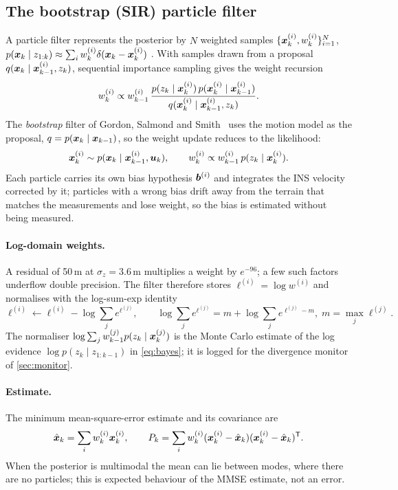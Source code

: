 \subsection{The bootstrap (SIR) particle filter}\label{sec:pf}
A particle filter represents the posterior by $N$ weighted samples
$\{\bm{x}_k^{(i)}, w_k^{(i)}\}_{i=1}^N$,
$p(\bm{x}_k \mid z_{1:k}) \approx \sum_i w_k^{(i)} \delta(\bm{x}_k - \bm{x}_k^{(i)})$
\cite{gordon1993,arulampalam2002,doucet2011}. With samples drawn from a proposal
$q(\bm{x}_k \mid \bm{x}_{k-1}^{(i)}, z_k)$, sequential importance sampling gives the weight recursion
\begin{equation}
  w_k^{(i)} \propto w_{k-1}^{(i)}\,
  \frac{p(z_k \mid \bm{x}_k^{(i)})\, p(\bm{x}_k^{(i)} \mid \bm{x}_{k-1}^{(i)})}
       {q(\bm{x}_k^{(i)} \mid \bm{x}_{k-1}^{(i)}, z_k)}.
\end{equation}
The \emph{bootstrap} filter of Gordon, Salmond and Smith~\cite{gordon1993} uses the motion
model as the proposal, $q = p(\bm{x}_k \mid \bm{x}_{k-1})$, so the weight update reduces to the
likelihood:
\begin{equation}
  \bm{x}_k^{(i)} \sim p(\bm{x}_k \mid \bm{x}_{k-1}^{(i)}, \bm{u}_k),\qquad
  w_k^{(i)} \propto w_{k-1}^{(i)}\, p(z_k \mid \bm{x}_k^{(i)}).
  \label{eq:sir}
\end{equation}
Each particle carries its own bias hypothesis $\bm{b}^{(i)}$ and integrates the INS velocity
corrected by it; particles with a wrong bias drift away from the terrain that matches the
measurements and lose weight, so the bias is estimated without being measured.

\paragraph{Log-domain weights.} A residual of 50\,m at $\sigma_z = 3.6$\,m multiplies a weight by
$e^{-96}$; a few such factors underflow double precision. The filter therefore stores
$\ell^{(i)} = \log w^{(i)}$ and normalises with the log-sum-exp identity
\begin{equation}
  \ell^{(i)} \leftarrow \ell^{(i)} - \log\sum_j e^{\ell^{(j)}}, \qquad
  \log\sum_j e^{\ell^{(j)}} = m + \log\sum_j e^{\ell^{(j)} - m},\; m = \max_j \ell^{(j)}.
\end{equation}
The normaliser $\log\sum_j w_{k-1}^{(j)} p(z_k\mid\bm{x}_k^{(j)})$ is the Monte Carlo estimate of
the log evidence $\log p(z_k \mid z_{1:k-1})$ in \eqref{eq:bayes}; it is logged for the
divergence monitor of \cref{sec:monitor}.

\paragraph{Estimate.} The minimum mean-square-error estimate and its covariance are
\begin{equation}
  \hat{\bm{x}}_k = \sum_i w_k^{(i)} \bm{x}_k^{(i)},\qquad
  P_k = \sum_i w_k^{(i)} (\bm{x}_k^{(i)} - \hat{\bm{x}}_k)(\bm{x}_k^{(i)} - \hat{\bm{x}}_k)^{\mathsf{T}} .
\end{equation}
When the posterior is multimodal the mean can lie between modes, where there are no
particles; this is expected behaviour of the MMSE estimate, not an error.

